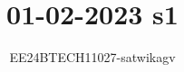 \documentclass[journal]{IEEEtran}
\begin{document}

\vspace{3cm}

\title{01-02-2023 s1}
\author{EE24BTECH11027-satwikagv}
{\let\newpage\relax\maketitle}

\renewcommand{\thefigure}{\theenumi}
\renewcommand{\thetable}{\theenumi}
\setlength{\intextsep}{10pt} %


\renewcommand{\thetable}{\theenumi}
\end{document}
